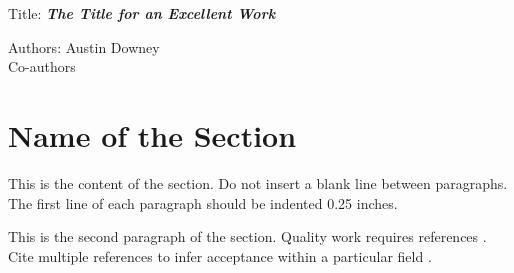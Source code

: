 \documentclass[12pt,letterpaper,onecolumn]{article}
\begin{document}
\begin{titlepage}
	{\noindent Title: {\bf \textit{ The Title for an Excellent Work}} }
	\vspace{1\baselineskip}

	{\noindent Authors: \hspace{4ex} Austin Downey \\}
	{\indent \hspace{10.5ex} Co-authors}
	\vspace{1\baselineskip}

\end{titlepage}

\vspace*{8cm}
\thispagestyle{specialfooter}
\enlargethispage{-2\baselineskip} %


\begin{abstract}
This is the abstract. The purpose of this \LaTeX \hspace{1ex} template is to assist others in preparing manuscripts for the International Workshop on Structural Health Monitoring (IWSHM).  I have tried to accurately reproduce the Microsoft Word template for the Proceedings of {\bf 9th International Workshop on Structural Health Monitoring 2013}, however, this work is not affiliated with the organizers of the IWSHM conferences. Please contact me with any changes or concerns, {austindowney@gmail.com}. The Microsoft Word template can be found in the downloaded the same folder at this \LaTeX \hspace{1ex} template and should be read on its own. Additionally, IWSHM requires a cover sheet and a copyright release form that can also be found in the provided Word document template.
\end{abstract}

\section{Name of the Section}

This is the content of the section. Do not insert a blank line between paragraphs. The first line of each paragraph should be indented 0.25 inches. 

This is the second paragraph of the section. Quality work requires references \cite{Downey2016Reconstructionplanestrain}.  Cite multiple references to infer acceptance within a particular field \cite{Yao2015Detectionsteelfatigue,Loh2009CarbonNanotubeSensing}.
\end{document}
